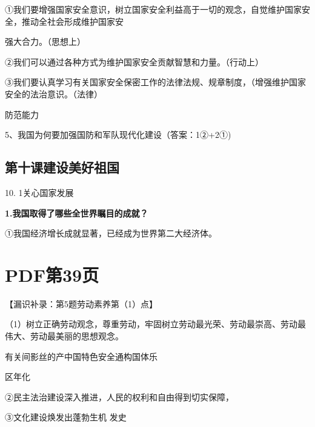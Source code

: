 \documentclass[lang=cn,11pt]{elegantbook}
\newcommand{\daofasym}[1]{{\daofasymbolfont #1}}
\newcommand{\daofasym}[1]{#1}
\begin{document}
\daofasym{①}我们要增强国家安全意识，树立国家安全利益高于一切的观念，自觉维护国家安全，推动全社会形成维护国家安\par

强大合力。（思想上）\par

\daofasym{②}我们可以通过各种方式为维护国家安全贡献智慧和力量。（行动上）\par

\daofasym{③}我们要认真学习有关国家安全保密工作的法律法规、规章制度，（增强维护国家安全的法治意识。（法律）\par

防范能力\par

5、我国为何要加强国防和军队现代化建设（答案：1\daofasym{②}+2\daofasym{①})\par

\subsection*{第十课建设美好祖国}

10. 1关心国家发展\par

\textbf{1.我国取得了哪些全世界瞩目的成就？}\par

\daofasym{①}我国经济增长成就显著，已经成为世界第二大经济体。\par


\section*{PDF第39页}

【漏识补录：第5题劳动素养第（1）点】\par

（1）树立正确劳动观念，尊重劳动，牢固树立劳动最光荣、劳动最崇高、劳动最伟大、劳动最美丽的思想观念。\par

有关间影丝的产中国特色安全通构国体乐\par

区年化\par

\daofasym{②}民主法治建设深入推进，人民的权利和自由得到切实保障，\par

\daofasym{③}文化建设焕发出蓬勃生机 发史\par
\end{document}

